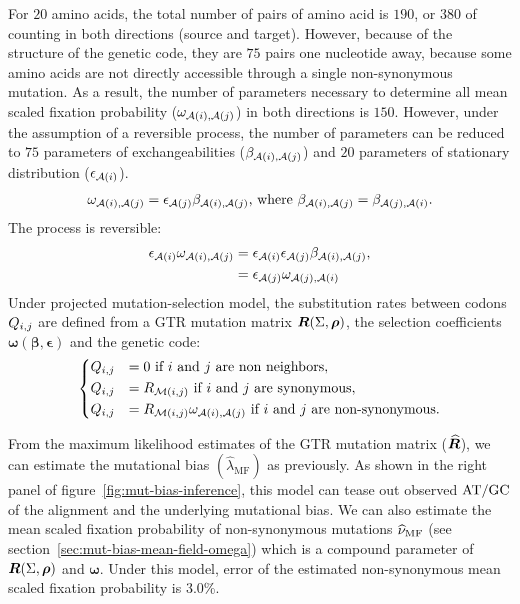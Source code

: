 For $20$ amino acids, the total number of pairs of amino acid is $190$, or $380$ of counting in both directions (source and target).
However, because of the structure of the genetic code, they are $75$ pairs one nucleotide away, because some amino acids are not directly accessible through a single non-synonymous mutation.
As a result, the number of parameters necessary to determine all mean scaled fixation probability ($\omega_{\mathcal{A}({i}), \mathcal{A}({j})}$) in both directions is $150$.
However, under the assumption of a reversible process, the number of parameters can be reduced to $75$ parameters of exchangeabilities ($\beta_{\mathcal{A}({i}), \mathcal{A}({j})}$) and $20$ parameters of stationary distribution ($\epsilon_{\mathcal{A}({i})}$).
\begin{align}
    \omega_{\mathcal{A}({i}), \mathcal{A}({j})} = \epsilon_{\mathcal{A}({j})} \beta_{\mathcal{A}({i}), \mathcal{A}({j})}\text{, where } \beta_{\mathcal{A}({i}), \mathcal{A}({j})} = \beta_{\mathcal{A}({j}), \mathcal{A}({i})}.
\end{align}
The process is reversible:
\begin{align}
    \epsilon_{\mathcal{A}({i})} \omega_{\mathcal{A}({i}), \mathcal{A}({j})} & = \epsilon_{\mathcal{A}({i})} \epsilon_{\mathcal{A}({j})} \beta_{\mathcal{A}({i}), \mathcal{A}({j})}, \\
    & = \epsilon_{\mathcal{A}({j})} \omega_{\mathcal{A}({j}), \mathcal{A}({i})}
\end{align}
Under projected mutation-selection model, the substitution rates between codons $Q_{{i}, {j}}$ are defined from a GTR mutation matrix $\bm{R}(\Sigma, \bm{\rho})$, the selection coefficients $\bm{\omega}(\bm{\beta}, \bm{\epsilon})$ and the genetic code:
\begin{equation}
    \begin{dcases}
        Q_{{i}, {j}} & = 0 \text{ if ${i}$ and ${j}$ are non neighbors}, \\
        Q_{{i}, {j}} & = R_{\mathcal{M}({i}, {j})} \text{ if ${i}$ and ${j}$ are synonymous}, \\
        Q_{{i}, {j}} & = R_{\mathcal{M}({i}, {j})} \omega_{\mathcal{A}({i}), \mathcal{A}({j})} \text{ if ${i}$ and ${j}$ are non-synonymous}.
    \end{dcases}
    \label{eq:codon-mean-field}
\end{equation}

From the maximum likelihood estimates of the \acrshort{GTR} mutation matrix ($\widehat{\bm{R}}$), we can estimate the mutational bias $\left({\widehat{\lambda}_{\text{MF}}} \right)$ as previously.
As shown in the right panel of figure~\ref{fig:mut-bias-inference}, this model can tease out observed $\text{AT/GC}$ of the alignment and the underlying mutational bias.
We can also estimate the mean scaled fixation probability of non-synonymous mutations $\widehat{\nu}_{\text{MF}}$ (see section~\ref{sec:mut-bias-mean-field-omega}) which is a compound parameter of $\bm{R}(\Sigma, \bm{\rho})$ and $\bm{\omega}$.
Under this model, error of the estimated non-synonymous mean scaled fixation probability is 3.0\%.

